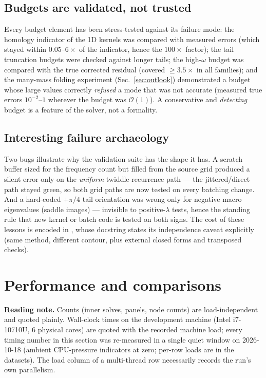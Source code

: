\documentclass[11pt,a4paper]{article}
\begin{document}
\subsection{Budgets are validated, not trusted}

Every budget element has been stress-tested against its failure mode: the
homology indicator of the 1D kernels was compared with measured errors
(which stayed within $0.05$--$6\times$ of the indicator, hence the
$100\times$ factor); the tail truncation budgets were checked against
longer tails; the high-$\omega$ budget was compared with the true corrected
residual (covered $\ge 3.5\times$ in all families); and the many-mass
folding experiment (Sec.~\ref{sec:outlook}) demonstrated a budget whose
large values correctly \emph{refused} a mode that was not accurate
(measured true errors $10^{-2}$--$1$ wherever the budget was $\mathcal
O(1)$).  A conservative and \emph{detecting} budget is a feature of the
solver, not a formality.

\subsection{Interesting failure archaeology}
Two bugs illustrate why the validation suite has the shape it has.  A
scratch buffer sized for the frequency count but filled from the source grid
produced a silent error only on the \emph{uniform} twiddle-recurrence path
--- the jittered/direct path stayed green, so both grid paths are now tested
on every batching change.  And a hard-coded $+\pi/4$ tail orientation was
wrong only for negative macro eigenvalues (saddle images) --- invisible to
positive-$\lambda$ tests, hence the standing rule that new kernel or batch
code is tested on both signs.  The cost of these lessons is encoded in
, whose docstring states its independence
caveat explicitly (same method, different contour, plus external closed
forms and transposed checks).

\section{Performance and comparisons}
\label{sec:perf}

\noindent\textbf{Reading note.}  Counts (inner solves, panels, node counts)
are load-independent and quoted plainly.  Wall-clock times on the
development machine (Intel i7-10710U, 6 physical cores) are quoted with the
recorded machine load; every timing number in this section was re-measured
in a single quiet window on 2026-10-18 (ambient CPU-pressure indicators at
zero; per-row loads are in the datasets).  The load column of a
multi-thread row necessarily records the run's own parallelism.
\end{document}
